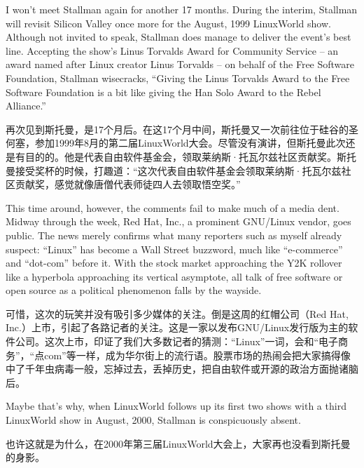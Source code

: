 \ifdefined\eng
I won't meet Stallman again for another 17 months. During the interim, Stallman will revisit Silicon Valley once more for the August, 1999 LinuxWorld show. Although not invited to speak, Stallman does manage to deliver the event's best line. Accepting the show's Linus Torvalds Award for Community Service -- an award named after Linux creator Linus Torvalds -- on behalf of the Free Software Foundation, Stallman wisecracks, ``Giving the Linus Torvalds Award to the Free Software Foundation is a bit like giving the Han Solo Award to the Rebel Alliance.''
\fi

\ifdefined\chs
再次见到斯托曼，是17个月后。在这17个月中间，斯托曼又一次前往位于硅谷的圣何塞，参加1999年8月的第二届LinuxWorld大会。尽管没有演讲，但斯托曼此次还是有目的的。他是代表自由软件基金会，领取莱纳斯·托瓦尔兹社区贡献奖。斯托曼接受奖杯的时候，打趣道：``这次代表自由软件基金会领取莱纳斯·托瓦尔兹社区贡献奖，感觉就像唐僧代表师徒四人去领取悟空奖。''
\fi

\ifdefined\eng
This time around, however, the comments fail to make much of a media dent. Midway through the week, Red Hat, Inc., a prominent GNU/Linux vendor, goes public. The news merely confirms what many reporters such as myself already suspect: ``Linux'' has become a Wall Street buzzword, much like ``e-commerce'' and ``dot-com'' before it. With the stock market approaching the Y2K rollover like a hyperbola approaching its vertical asymptote, all talk of free software or open source as a political phenomenon falls by the wayside.
\fi

\ifdefined\chs
可惜，这次的玩笑并没有吸引多少媒体的关注。倒是这周的红帽公司（Red Hat, Inc.）上市，引起了各路记者的关注。这是一家以发布GNU/Linux发行版为主的软件公司。这次上市，印证了我们大多数记者的猜测：``Linux''一词，会和``电子商务''，``点com''等一样，成为华尔街上的流行语。股票市场的热闹会把大家搞得像中了千年虫病毒一般，忘掉过去，丢掉历史，把自由软件或开源的政治方面抛诸脑后。
\fi

\ifdefined\eng
Maybe that's why, when LinuxWorld follows up its first two shows with a third LinuxWorld show in August, 2000, Stallman is conspicuously absent.
\fi

\ifdefined\chs
也许这就是为什么，在2000年第三届LinuxWorld大会上，大家再也没看到斯托曼的身影。
\fi

